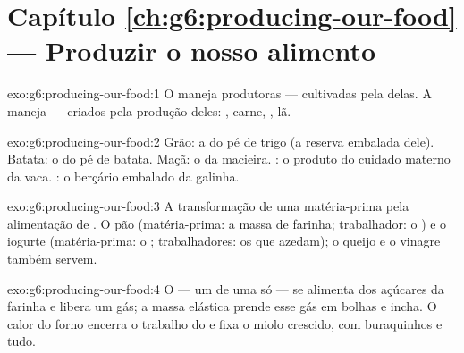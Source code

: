 \section*{Capítulo \ref{ch:g6:producing-our-food} --- Produzir o nosso alimento}

\begin{solution}{exo:g6:producing-our-food:1}
O  maneja produtoras ---  cultivadas pela  delas. A  maneja  --- 
criados pela produção deles: , carne, , lã.
\end{solution}

\begin{solution}{exo:g6:producing-our-food:2}
Grão: a  do pé de trigo (a reserva embalada dele). Batata: o
 do pé de batata. Maçã: o  da macieira. : o produto
do cuidado materno da vaca. : o berçário embalado da galinha.
\end{solution}

\begin{solution}{exo:g6:producing-our-food:3}
A transformação de uma matéria-prima pela alimentação de . O
pão (matéria-prima: a massa de farinha; trabalhador: o ) e o
iogurte (matéria-prima: o ; trabalhadores: os  que
azedam); o queijo e o vinagre também servem.
\end{solution}

\begin{solution}{exo:g6:producing-our-food:4}
O  --- um  de uma  só --- se alimenta dos açúcares
da farinha e libera um gás; a massa elástica prende esse gás em bolhas
e incha. O calor do forno encerra o trabalho do  e fixa o
miolo crescido, com buraquinhos e tudo.
\end{solution}

